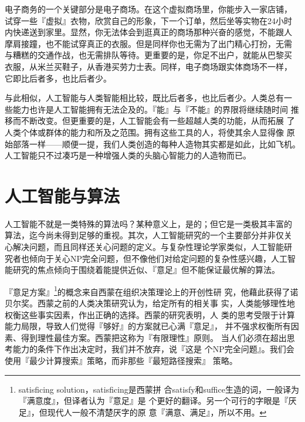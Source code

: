 \documentclass[12pt,a4paper]{article}
\begin{document}
电子商务的一个关键部分是电子商场。在这个虚拟商场里，你能步入一家店铺，
试穿一些『虚拟』衣物，欣赏自己的形象，下一个订单，然后坐等实物在24小时
内快递送到家里。显然，你无法体会到逛真正的商场那种兴奋的感觉，不能跟人
摩肩接蹱，也不能试穿真正的衣服。但是同样你也无需为了出门精心打扮，无需
与糟糕的交通作战，也无需排队等待。更重要的是，你足不出户，就能从巴黎买
衣服，从米兰买鞋子，从香港买劳力士表。同样，电子商场跟实体商场不一样，
它即比后者多，也比后者少。

与此相似，人工智能与人类智能相比较，既比后者多，也比后者少。人类总有一
些能力也许是人工智能拥有无法企及的。『能』与『不能』的界限将继续随时间
推移而不断改变。但更重要的是，人工智能会有一些超越人类的功能，从而拓展
了人类个体或群体的能力和所及之范围。拥有这些工具的人，将使其余人显得像
原始部落一样——顺便一提，我们人类创造的每种人造物其实都是如此，比如飞机。
人工智能只不过凑巧是一种增强人类的头脑心智能力的人造物而已。

\section{人工智能与算法}

人工智能不就是一类特殊的算法吗？某种意义上，是的；但它是一类极其丰富的
算法，迄今尚未得到足够的重视。其次，人工智能研究的一个主要部分并非仅关
心解决问题，而且同样还关心问题的定义。与复杂性理论学家类似，人工智能研
究者也倾向于关心NP完全问题，但不像他们对给定问题的复杂性感兴趣，人工智
能研究的焦点倾向于围绕着能提供近似、『意足』但不能保证最优解的算法。

『意足方案』\footnote{satisficing solution，satisficing是西蒙拼
  合satisfy和suffice生造的词，一般译为『满意度』，但译者认为『意足』是
  个更好的翻译。另一个可行的字眼是『厌足』，但现代人一般不清楚厌字的原
  意『满意、满足』，所以不用。}的概念来自西蒙在组织决策理论上的开创性研
究，他藉此获得了诺贝尔奖。西蒙之前的人类决策研究认为，给定所有的相关事
实，人类能够理性地权衡这些事实因素，作出正确的选择。西蒙的研究表明，人
类的思考受限于计算能力局限，导致人们觉得『够好』的方案就已心满『意足』，
并不强求权衡所有因素、得到理性最佳方案。西蒙把这称为『有限理性』原则。
当人们必须在超出思考能力的条件下作出决定时，我们并不放弃，说『这是
个NP完全问题』。我们会使用『最少计算搜索』策略，而非那些『最短路径搜索』
策略。
\end{document}
